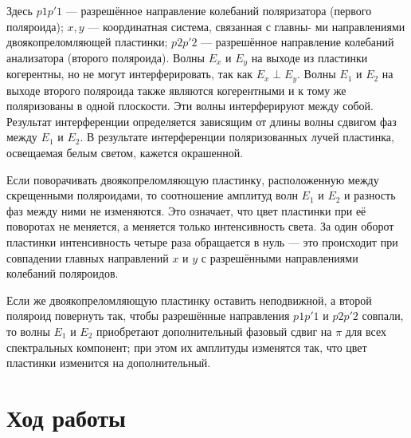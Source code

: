 \documentclass[15pt,a5paper,reqno]{article}
\begin{document}
Здесь $ p1p'1 $ --- разрешённое направление колебаний поляризатора
(первого поляроида); $ x, y $ --- координатная система, связанная с главны-
ми направлениями двоякопреломляющей пластинки; $ p2p'2 $ --- разрешённое направление колебаний анализатора (второго поляроида). Волны
$ E_x  $ и $ E_y $ на выходе из пластинки когерентны, но не могут интерферировать, так как $ E_x \perp  E_y $. Волны $ E_1 $ и $ E_2 $ на выходе второго поляроида
также являются когерентными и к тому же поляризованы в одной плоскости. Эти волны интерферируют между собой. Результат интерференции определяется зависящим от длины волны сдвигом фаз между $ E_1 $
и $ E_2 $. В результате интерференции поляризованных лучей пластинка, освещаемая белым светом, кажется окрашенной.

Если поворачивать двоякопреломляющую пластинку, расположенную между
скрещенными поляроидами, то соотношение амплитуд волн $ E_1 $ и $ E_2 $ и разность фаз между ними не изменяются. Это означает, что цвет пластинки при её поворотах не меняется, а меняется только интенсивность света. За один оборот пластинки интенсивность четыре раза обращается в нуль --- это происходит при совпадении главных направлений
$ x $ и $ y $ с разрешёнными направлениями колебаний поляроидов.

Если же двоякопреломляющую пластинку оставить неподвижной, а
второй поляроид повернуть так, чтобы разрешённые направления $ p1p'1 $
и $ p2p'2 $ совпали, то волны $ E_1 $ и $ E_2 $ приобретают дополнительный фазовый сдвиг на $ \pi $ для всех спектральных компонент; при этом их амплитуды изменятся так, что цвет пластинки изменится на дополнительный.


\section{Ход работы}
\end{document}
